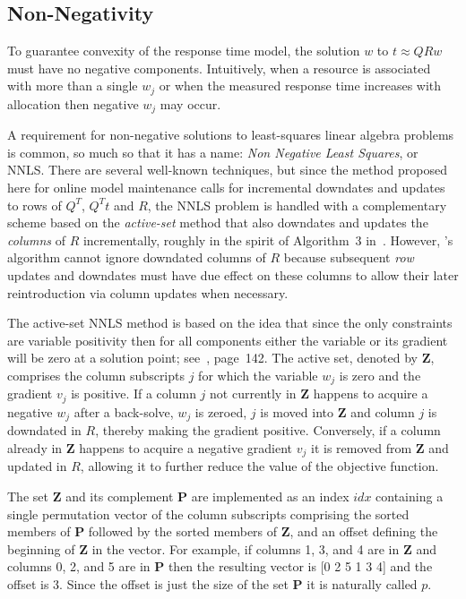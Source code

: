 \subsection*{Non-Negativity}

To guarantee convexity of the response time model, the solution $w$ to $t \approx QRw$ must have no negative components.
Intuitively, when a resource is associated with more than a single $w_j$
or when the measured response time increases with allocation then negative $w_j$ may occur.

A requirement for non-negative solutions to least-squares linear algebra problems is common,
so much so that it has a name: \emph{Non Negative Least Squares}, or NNLS.
There are several well-known techniques\cite{ChPl},
but since the method proposed here for online model maintenance calls for
incremental downdates and updates to rows of $Q^T$, $Q^Tt$ and $R$,
the NNLS problem is handled with a complementary scheme
based on the \emph{active-set} method\cite{LaHa} that
also downdates and updates the \emph{columns} of $R$ incrementally,
roughly in the spirit of Algorithm~3 in~\cite{LuDu}.
However, \pacora's algorithm cannot ignore downdated columns of $R$
because subsequent \emph{row} updates and downdates must have due effect
on these columns to allow their later reintroduction via column updates when necessary.

The active-set NNLS method is based on the idea that since the only constraints are variable positivity
then for all components either the variable or its gradient will be zero at a solution point; see~\cite{BoVa}, page~142.
The active set, denoted by \textbf{Z}, comprises the column subscripts $j$ for which the variable $w_j$ is zero and the gradient $v_j$ is positive.
If a column $j$ not currently in \textbf{Z} happens to acquire a negative $w_j$ after a back-solve, $w_j$ is zeroed,
$j$ is moved into \textbf{Z} and column $j$ is downdated in $R$, thereby making the gradient positive.
Conversely, if a column already in \textbf{Z} happens to acquire a negative gradient $v_j$ it is removed from \textbf{Z} and updated in $R$,
allowing it to further reduce the value of the objective function.

The set \textbf{Z} and its complement \textbf{P} are implemented as an index $idx$
containing a single permutation vector of the column subscripts comprising
the sorted members of \textbf{P} followed by the sorted members of \textbf{Z},
and an offset defining the beginning of \textbf{Z} in the vector.
For example, if columns 1, 3, and 4 are in \textbf{Z} and columns 0, 2, and 5 are in \textbf{P}
then the resulting vector is [0 2 5 1 3 4] and the offset is 3.
Since the offset is just the size of the set \textbf{P} it is naturally called $p$.

